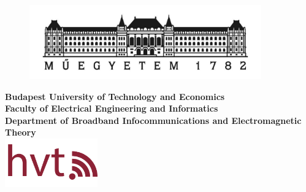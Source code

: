\begin{titlepage}

\begin{figure}
\centering
\includegraphics[width=100mm,keepaspectratio]{bme.pdf}
\end{figure}

\centering
\textbf{Budapest University of Technology and Economics}\\
\textbf{Faculty of Electrical Engineering and Informatics}\\
\textbf{Department of Broadband Infocommunications and Electromagnetic Theory}\\
\vspace{5mm}
\includegraphics[width=40mm,keepaspectratio]{hvt_logo_only_fixed_vector_inverted.png}  \\
\vspace{50mm}
\Huge
\doctitle\\
\vspace{60mm}
\Large
\thetitle \\
\vspace{12mm}
\Large
\textbf{\theauthor}\\
\vspace{12mm}
\the\year


\end{titlepage}